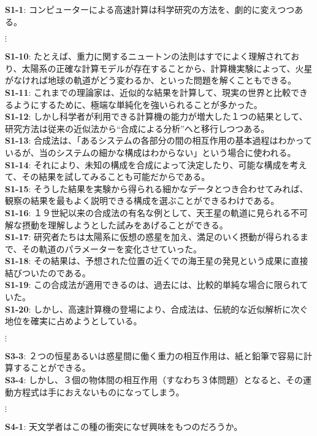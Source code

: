 {\noindent
{\bf S1-1}: コンピューターによる高速計算は科学研究の方法を、劇的に変えつつある。 
\begin{center}
$\vdots$
\end{center}
{\bf S1-10}: たとえば、重力に関するニュートンの法則はすでによく理解されており、太陽系の正確な計算モデルが存在することから、計算機実験によって、火星がなければ地球の軌道がどう変わるか、といった問題を解くこともできる。\\
{\bf S1-11}: これまでの理論家は、近似的な結果を計算して、現実の世界と比較できるようにするために、極端な単純化を強いられることが多かった。 \\
{\bf S1-12}: しかし科学者が利用できる計算機の能力が増大した１つの結果として、研究方法は従来の近似法から“合成による分析”へと移行しつつある。 \\
{\bf S1-13}: 合成法は、「あるシステムの各部分の間の相互作用の基本過程はわかっているが、当のシステムの細かな構成はわからない」という場合に使われる。 \\
{\bf S1-14}: それにより、未知の構成を合成によって決定したり、可能な構成を考えて、その結果を試してみることも可能だからである。 \\
{\bf S1-15}: そうした結果を実験から得られる細かなデータとつき合わせてみれば、観察の結果を最もよく説明できる構成を選ぶことができるわけである。 \\
{\bf S1-16}: １９世紀以来の合成法の有名な例として、天王星の軌道に見られる不可解な摂動を理解しようとした試みをあげることができる。 \\
{\bf S1-17}: 研究者たちは太陽系に仮想の惑星を加え、満足のいく摂動が得られるまで、その軌道のパラメーターを変化させていった。 \\
{\bf S1-18}: その結果は、予想された位置の近くでの海王星の発見という成果に直接結びついたのである。 \\
{\bf S1-19}: この合成法が適用できるのは、過去には、比較的単純な場合に限られていた。 \\
{\bf S1-20}: しかし、高速計算機の登場により、合成法は、伝統的な近似解析に次ぐ地位を確実に占めようとしている。
\begin{center}
$\vdots$
\end{center}
{\bf S3-3}: ２つの恒星あるいは惑星間に働く重力の相互作用は、紙と鉛筆で容易に計算することができる。 \\
{\bf S3-4}: しかし、３個の物体間の相互作用（すなわち３体問題）となると、その運動方程式は手におえないものになってしまう。 
\begin{center}
$\vdots$
\end{center}
{\bf S4-1}: 天文学者はこの種の衝突になぜ興味をもつのだろうか。 \\
}

